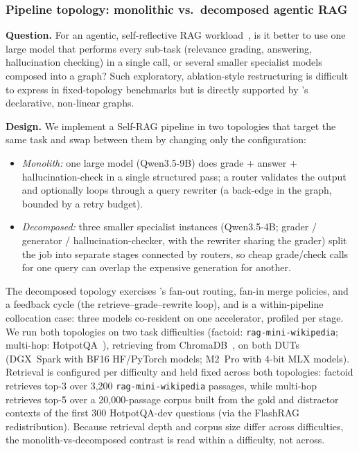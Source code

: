 \subsubsection{Pipeline topology: monolithic vs.\ decomposed agentic RAG}
\label{sec:exp-topology}

\textbf{Question.} For an agentic, self-reflective RAG
workload~\cite{asai2024selfrag}, is it better to use one large model that
performs every sub-task (relevance grading, answering, hallucination checking)
in a single call, or several smaller specialist models composed into a graph?
Such exploratory, ablation-style restructuring is difficult to express in
fixed-topology benchmarks but is directly supported by \sysname{}'s declarative,
non-linear graphs.

\textbf{Design.} We implement a Self-RAG pipeline in two topologies that target
the same task and swap between them by changing only the configuration:
\begin{itemize}
  \item \emph{Monolith:} one large model (Qwen3.5-9B) does grade + answer +
    hallucination-check in a single structured pass; a router validates the
    output and optionally loops through a query rewriter (a back-edge in the
    graph, bounded by a retry budget).
  \item \emph{Decomposed:} three smaller specialist instances (Qwen3.5-4B;
    grader / generator / hallucination-checker, with the rewriter sharing the grader)
    split the job into separate stages connected by routers, so cheap
    grade/check calls for one query can overlap the expensive generation for
    another.
\end{itemize}
The decomposed topology exercises \sysname{}'s fan-out routing, fan-in merge
policies, and a feedback cycle (the retrieve--grade--rewrite loop), and is a
within-pipeline collocation case: three models co-resident on one accelerator,
profiled per stage. We run both topologies on two task difficulties (factoid:
\texttt{rag-mini-wikipedia}; multi-hop: HotpotQA~\cite{yang2018hotpotqa}),
retrieving from ChromaDB~\cite{chroma}, on both DUTs (DGX~Spark with BF16
HF/PyTorch models; M2~Pro with 4-bit MLX models). Retrieval is configured per
difficulty and held fixed across both topologies: factoid retrieves top-3 over
3{,}200 \texttt{rag-mini-wikipedia} passages, while multi-hop retrieves top-5
over a 20{,}000-passage corpus built from the gold and distractor contexts of
the first 300 HotpotQA-dev questions (via the FlashRAG redistribution). Because
retrieval depth and corpus size differ across difficulties, the
monolith-vs-decomposed contrast is read within a difficulty, not across.

